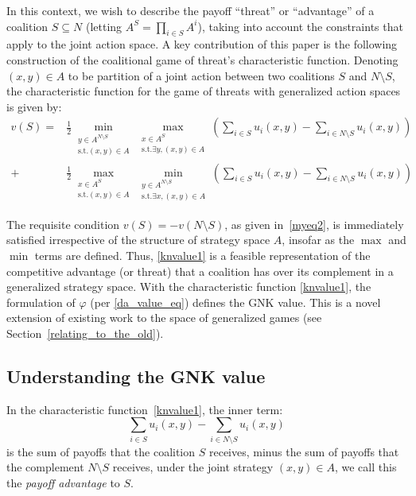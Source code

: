 In this context, we wish to describe the payoff ``threat'' or ``advantage'' of a coalition $S\subseteq N$ (letting $A^S=\prod_{i\in S}A^i$), taking into account the constraints that apply to the joint action space.  
A key contribution of this paper is the following construction of the coalitional game of threat's characteristic function. 
Denoting $(x,y)\in A$ to be partition of a joint action between two coalitions $S$ and $N\setminus S$, 
the characteristic function for the game of threats with generalized action spaces is given by:
\begin{align}
\label{knvalue1}
v(S) = &
\frac{1}{2}\min_{\substack{y\in A^{N\setminus S} \\ \text{s.t.}(x,y)\in A}} 
\max_{\substack{x\in A^S \\ \text{s.t.}\exists y,(x,y)\in A}}
	\left(\sum_{i\in S} u_i(x,y) - \sum_{i\in N\setminus S}u_i(x,y)\right)\nonumber\\
+&
\frac{1}{2}\max_{\substack{x\in A^S \\ \text{s.t.}(x,y)\in A}} 
\min_{\substack{y\in A^{N\setminus S} \\ \text{s.t.}\exists x,(x,y)\in A}}
	\left(\sum_{i\in S} u_i(x,y) - \sum_{i\in N\setminus S} u_i(x,y) \right)
\end{align}

The requisite condition $v(S)=-v(N\setminus S)$, as given in~\eqref{myeq2}, is immediately satisfied irrespective of the structure of strategy space $A$, insofar as the $\max$ and $\min$ terms are defined.
Thus, \eqref{knvalue1} is a feasible representation of the competitive advantage (or threat) that a coalition has over its complement in a generalized strategy space.
With the characteristic function \eqref{knvalue1}, the formulation of $\varphi$ (per \eqref{da_value_eq}) defines the GNK value.
This is a novel extension of existing work to the space of generalized games (see Section~\ref{relating_to_the_old}).

\subsection{Understanding the GNK value}\label{the_value_def4}

In the characteristic function~\eqref{knvalue1}, the inner term:
\[
\sum_{i\in S} u_i(x,y) - \sum_{i\in N\setminus S} u_i(x,y)
\] 
is the sum of payoffs that the coalition $S$ receives, 
minus the sum of payoffs that the complement $N\setminus S$ receives, 
under the joint strategy $(x,y)\in A$, we call this the \textit{payoff advantage} to $S$.

